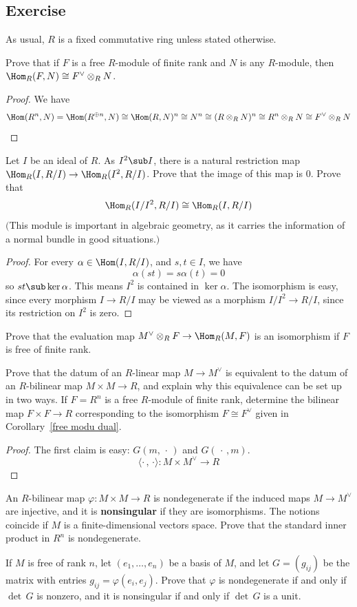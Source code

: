 \subsection{Exercise}
As usual, $R$ is a fixed commutative ring unless stated otherwise.
\begin{exercise}\label{dual free iso}
Prove that if $F$ is a free $R$-module of finite rank and $N$ is any $R$-module, then $\Hom_R(F,N)\cong F^{\vee}\otimes_{R}N$.
\end{exercise}
\begin{proof}
We have
\[\Hom(R^n,N)=\Hom(R^{\oplus n},N)\cong\Hom(R,N)^n\cong N^n\cong (R\otimes_{R}N)^n\cong R^n\otimes_{R}N\cong F^{\vee}\otimes_{R}N\]
\end{proof}
\begin{exercise}
Let $I$ be an ideal of $R$. As $I^2\sub I$, there is a natural restriction map $\Hom_R(I,R/I)\to\Hom_R(I^2,R/I)$. Prove that the image of this map is $0$. Prove that \[\Hom_R(I/I^2,R/I)\cong\Hom_R(I,R/I)\]
$($This module is important in algebraic geometry, as it carries the information of a normal bundle in good situations.$)$
\end{exercise}
\begin{proof}
For every $\alpha\in\Hom(I,R/I)$, and $s,t\in I$, we have
\[\alpha(st)=s\alpha(t)=0\]
so $st\sub \ker\alpha$. This means $I^2$ is contained in $\ker\alpha$. The isomorphism is easy, since every morphism $I\to R/I$ may be viewed as a morphism $I/I^2\to R/I$, since its restriction on $I^2$ is zero.
\end{proof}
\begin{exercise}
Prove that the evaluation map $M^{\vee}\otimes_{R}F\to\Hom_R(M,F)$ is an isomorphism if $F$ is free of finite rank.
\end{exercise}
\begin{exercise}\label{datum to dual}
Prove that the datum of an $R$-linear map $M\to M^{\vee}$ is equivalent to the datum of an $R$-bilinear map $M\times M\to R$, and explain why this equivalence can be set up in two ways. If $F=R^n$ is a free $R$-module of finite rank, determine the bilinear map $F\times F\to R$ corresponding to the isomorphism $F\cong F^{\vee}$ given in Corollary~\ref{free modu dual}.
\end{exercise}
\begin{proof}
The first claim is easy: $G(m,\,\cdot\,)$ and $G(\,\cdot\,,m)$.
\[\langle\cdot\,,\,\cdot\rangle:M\times M^{\vee}\to R\]
\end{proof}
\begin{exercise}
An $R$-bilinear map $\varphi:M\times M\to R$ is nondegenerate if the induced maps $M\to M^{\vee}$ are injective, and it is \textbf{nonsingular} if they are isomorphisms. The notions coincide if $M$ is a finite-dimensional vectors space. Prove that the standard inner product in $R^n$ is nondegenerate.\par
If $M$ is free of rank $n$, let $(e_1,\dots,e_n)$ be a basis of $M$, and let $G=(g_{ij})$ be the matrix with entries $g_{ij}=\varphi(e_i,e_j)$. Prove that $\varphi$ is nondegenerate if and only
if $\det\,G$ is nonzero, and it is nonsingular if and only if $\det\,G$ is a unit.
\end{exercise}
